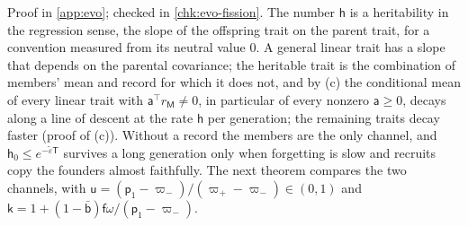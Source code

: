 Proof in \cref{app:evo}; checked in \cref{chk:evo-fission}. The number $\mathsf h$ is a heritability in the regression sense, the slope of the offspring trait on the parent trait, for a convention measured from its neutral value $0$. A general linear trait has a slope that depends on the parental covariance; the heritable trait is the combination of members' mean and record for which it does not, and by (c) the conditional mean of every linear trait with $\mathsf a^\top r_{\mathsf M}\ne0$, in particular of every nonzero $\mathsf a\ge0$, decays along a line of descent at the rate $\mathsf h$ per generation; the remaining traits decay faster (proof of (c)). Without a record the members are the only channel, and $\mathsf h_0\le e^{-\tilde\varepsilon\mathsf T}$ survives a long generation only when forgetting is slow and recruits copy the founders almost faithfully. The next theorem compares the two channels, with $\mathsf u=(\mathsf p_1-\varpi_-)/(\varpi_+-\varpi_-)\in(0,1)$ and $\mathsf k=1+(1-\bar{\mathsf b})\mathsf f\omega/(\mathsf p_1-\varpi_-)$.

